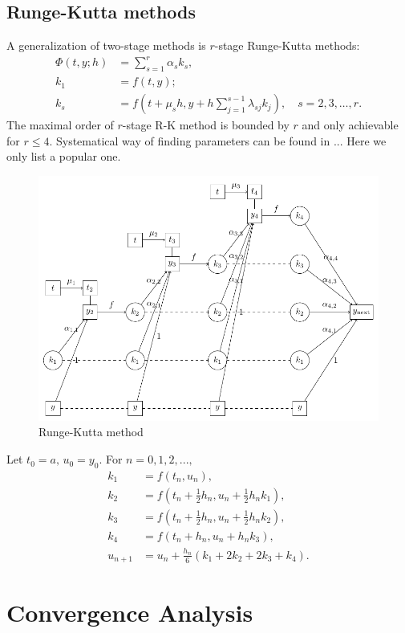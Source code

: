 \documentclass[10pt]{amsart}
\begin{document}
\subsection{Runge-Kutta methods}
A generalization of two-stage methods is $r$-stage Runge-Kutta methods:
\begin{align*}
\Phi(t, y; h) &= \sum_{s=1}^r \alpha_s k_s,\\
k_1 &= f(t, y);\\
k_s & = f(t+\mu_s h, y + h \sum_{j=1}^{s-1}\lambda_{sj}k_j), \quad s = 2,3,\ldots, r.
\end{align*}
The maximal order of $r$-stage R-K method is bounded by $r$ and only achievable for $r\leq 4$. Systematical way of finding parameters can be found in ... Here we only list a popular one.

\begin{figure}[htbp]
\begin{center}
\includegraphics[width=4.6in]{figures/RKlatex.pdf}
\caption{Runge-Kutta method}
\label{fig:RK}
\end{center}
\end{figure}

\begin{tcolorbox}[colframe=black!15!white, coltitle=white!5!black, title = \bf The classical $4$-th order Runge-Kutta method]
Let $t_0=a,\, u_0 = y_0$. For $n=0,1,2,...,$
\begin{align*}
k_1 &= f(t_n, u_n),\\
k_2 & = f(t_n + \frac{1}{2}h_n, u_n + \frac{1}{2}h_n k_1),\\
k_3 & = f(t_n + \frac{1}{2}h_n, u_n + \frac{1}{2}h_n k_2),\\
k_4 & = f(t_n + h_n, u_n + h_n k_3),\\
u_{n+1} &= u_n +  \frac{h_n}{6}( k_1 + 2k_2 + 2k_3 + k_4).
\end{align*}
\end{tcolorbox}

\section{Convergence Analysis}
\end{document}
